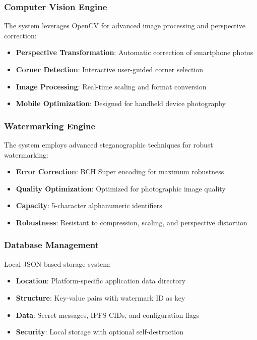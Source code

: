 \documentclass[12pt,a4paper]{article}
\begin{document}
\subsubsection{Computer Vision Engine}
The system leverages OpenCV for advanced image processing and perspective correction:
\begin{itemize}
    \item \textbf{Perspective Transformation}: Automatic correction of smartphone photos
    \item \textbf{Corner Detection}: Interactive user-guided corner selection
    \item \textbf{Image Processing}: Real-time scaling and format conversion
    \item \textbf{Mobile Optimization}: Designed for handheld device photography
\end{itemize}

\subsubsection{Watermarking Engine}
The system employs advanced steganographic techniques for robust watermarking:
\begin{itemize}
    \item \textbf{Error Correction}: BCH Super encoding for maximum robustness
    \item \textbf{Quality Optimization}: Optimized for photographic image quality
    \item \textbf{Capacity}: 5-character alphanumeric identifiers
    \item \textbf{Robustness}: Resistant to compression, scaling, and perspective distortion
\end{itemize}

\subsubsection{Database Management}
Local JSON-based storage system:
\begin{itemize}
    \item \textbf{Location}: Platform-specific application data directory
    \item \textbf{Structure}: Key-value pairs with watermark ID as key
    \item \textbf{Data}: Secret messages, IPFS CIDs, and configuration flags
    \item \textbf{Security}: Local storage with optional self-destruction
\end{itemize}
\end{document}

